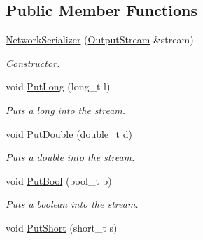 \subsection*{Public Member Functions}
\begin{DoxyCompactItemize}
\item 
\hyperlink{class_common_1_1_network_serializer_a886a55466be3531c3b8cfa13cf029c7e}{Network\-Serializer} (\hyperlink{class_common_1_1_output_stream}{Output\-Stream} \&stream)
\begin{DoxyCompactList}\small\item\em Constructor. \end{DoxyCompactList}\item 
\hypertarget{class_common_1_1_network_serializer_a13e38d2db5b3583ed6265f68568e48cd}{void \hyperlink{class_common_1_1_network_serializer_a13e38d2db5b3583ed6265f68568e48cd}{Put\-Long} (long\-\_\-t l)}\label{class_common_1_1_network_serializer_a13e38d2db5b3583ed6265f68568e48cd}

\begin{DoxyCompactList}\small\item\em Puts a long into the stream. \end{DoxyCompactList}\item 
\hypertarget{class_common_1_1_network_serializer_acac3ed81f0c658d919365fd384508301}{void \hyperlink{class_common_1_1_network_serializer_acac3ed81f0c658d919365fd384508301}{Put\-Double} (double\-\_\-t d)}\label{class_common_1_1_network_serializer_acac3ed81f0c658d919365fd384508301}

\begin{DoxyCompactList}\small\item\em Puts a double into the stream. \end{DoxyCompactList}\item 
\hypertarget{class_common_1_1_network_serializer_a85591a5747364e3f372474ba8273322e}{void \hyperlink{class_common_1_1_network_serializer_a85591a5747364e3f372474ba8273322e}{Put\-Bool} (bool\-\_\-t b)}\label{class_common_1_1_network_serializer_a85591a5747364e3f372474ba8273322e}

\begin{DoxyCompactList}\small\item\em Puts a boolean into the stream. \end{DoxyCompactList}\item 
\hypertarget{class_common_1_1_network_serializer_a9000854e6736ee5d066bc89f493f0133}{void \hyperlink{class_common_1_1_network_serializer_a9000854e6736ee5d066bc89f493f0133}{Put\-Short} (short\-\_\-t s)}\label{class_common_1_1_network_serializer_a9000854e6736ee5d066bc89f493f0133}


\end{DoxyCompactItemize}
